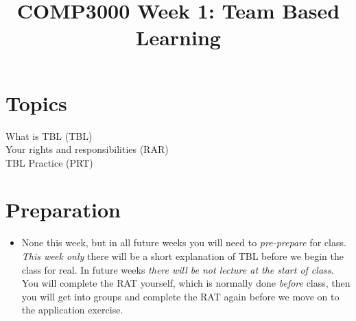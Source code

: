 \documentclass[twoside=false,DIV=14]{scrartcl}
\title{\color{redish} \vspace{-1em}COMP3000 Week 1: Team Based Learning}
\begin{document}
{\color{blackish}\maketitle}\vspace{-7em}

\begin{abstract}
\end{abstract}

\section*{Topics}
\begin{description}
\item[What is TBL (TBL)]  
\item[Your rights and responsibilities (RAR)]  
\item[TBL Practice (PRT)]
\end{description}
\section*{Preparation}
\begin{itemize}
\item None this week, but in all future weeks you will need to \emph{pre-prepare} for class.  \emph{This week only} there will be a short explanation of TBL before we begin the class for real.  In future weeks \emph{there will be not lecture at the start of class}.  You will complete the RAT yourself, which is normally done \emph{before} class, then you will get into groups and complete the RAT again before we move on to the application exercise.
\end{itemize}


\newpage
\end{document}
